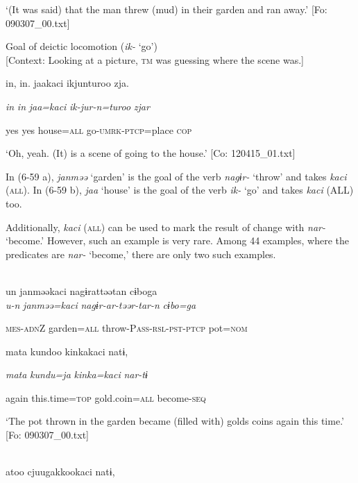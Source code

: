 \glt ‘(It was said) that the man threw (mud) in their garden and ran away.’ [Fo: 090307\_00.txt]
\z

 \ex Goal of deictic locomotion (\textit{ik-} ‘go’)\\{}
[Context: Looking at a picture, \textsc{tm} was guessing where the scene was.]

{\TM}
\gll in,  in.  jaakaci  ikjunturoo  zja.

      \textit{in}  \textit{in}  \textit{jaa=kaci}  \textit{ik-jur-n=turoo}  \textit{zjar}

      yes  yes  house=\textsc{all}  go-\textsc{umrk}-\textsc{ptcp}=place  \textsc{cop}

\glt ‘Oh, yeah. (It) is a scene of going to the house.’ [Co: 120415\_01.txt]
\z

In (6-59 a), \textit{janməə} ‘garden’ is the goal of the verb \textit{nagɨr-} ‘throw’ and takes \textit{kaci} (\textsc{all}). In (6-59 b), \textit{jaa} ‘house’ is the goal of the verb \textit{ik-} ‘go’ and takes \textit{kaci} (ALL) too.

Additionally, \textit{kaci} (\textsc{all}) can be used to mark the result of change with \textit{nar-} ‘become.’ However, such an example is very rare. Among 44 examples, where the predicates are \textit{nar-} ‘become,’ there are only two such examples.

\ea\label{ex:6-60}
\ea{}\\
\gll  {\TM}  un  janməəkaci  nagɨrattəətan  cɨboga\\

      \textit{u-n}  \textit{janməə=kaci}  \textit{nagɨr-ar-təər-tar-n}  \textit{cɨbo=ga}

      \textsc{mes}-\textsc{adn}Z  garden=\textsc{all}  throw-P\textsc{ass}-\textsc{rsl}-\textsc{pst}-\textsc{ptcp}  pot=\textsc{nom}

      mata  kundoo  kinkakaci  natɨ,

      \textit{mata}  \textit{kundu=ja}  \textit{kinka=kaci}  \textit{nar{}-tɨ}

      again  this.time=\textsc{top}  gold.coin=\textsc{all}  become-\textsc{seq}

\glt ‘The pot thrown in the garden became (filled with) golds coins again this time.’ [Fo: 090307\_00.txt]
\z

 \ex{}\\
{\TM}
\gll  atoo  cjuugakkookaci  natɨ,\\


